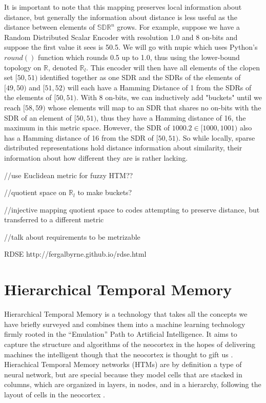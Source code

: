 \documentclass[fleqn,notitlepage,minimal]{article}
\begin{document}
	It is important to note that this mapping preserves local information about distance, but generally the information about distance is less useful as the distance between elements of $\mathbb{SDR}^{n}$ grows. For example, suppose we have a Random Distributed Scalar Encoder with resolution 1.0 and 8 on-bits and suppose the first value it sees is 50.5. We will go with nupic which uses Python's $round()$ function which rounds 0.5 up to 1.0, thus using the lower-bound topology on $\mathbb{R}$, denoted $\mathbb{R}_{l}$. This encoder will then have all elements of the clopen set $[50,51)$ identified together as one SDR and the SDRs of the elements of $[49,50)$ and $[51,52)$ will each have a Hamming Distance of 1 from the SDRs of the elements of $[50,51)$. With 8 on-bits, we can inductively add "buckets" until we reach $[58,59)$ whose elements will map to an SDR that shares no on-bits with the SDR of an element of $[50,51)$, thus they have a Hamming distance of 16, the maximum in this metric space. However, the SDR of $1000.2 \in [1000,1001)$ also has a Hamming distance of 16 from the SDR of $[50,51)$. So while locally, sparse distributed representations hold distance information about similarity, their information about how different they are is rather lacking.
	
	//use Euclidean metric for fuzzy HTM?? 
	
	//quotient space on $\mathbb{R}_{l}$ to make buckets?
	
	//injective mapping quotient space to codes attempting to preserve distance, but transferred to a different metric
	
	//talk about requirements to be metrizable
	
	RDSE http://fergalbyrne.github.io/rdse.html
	
	\section{Hierarchical Temporal Memory}
	
	Hierarchical Temporal Memory is a technology that takes all the concepts we have briefly surveyed and combines them into a machine learning technology firmly rooted in the ``Emulation'' Path to Artificial Intelligence. It aims to capture the structure and algorithms of the neocortex in the hopes of delivering machines the intelligent though that the neocortex is thought to gift us \cite{Whitepaper}. Hierachical Temporal Memory networks (HTMs) are by definition a type of neural network, but are special because they model cells that are stacked in columns, which are organized in layers, in nodes, and in a hierarchy, following the layout of cells in the neocortex \cite{Whitepaper}.
	
\end{document}

